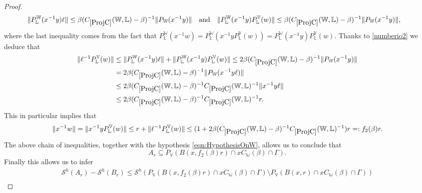 \documentclass[10pt, a4paper,
oneside, headinclude,footinclude]{scrartcl}
\begin{document}
\begin{proof}
 \begin{align}
      \lVert P_\mathbb{L}^\mathbb{W}(x^{-1}y)\ell\rVert\leq \beta(\oldC{ProjC}(\mathbb W,\mathbb L)-\beta)^{-1}\lVert P_\mathbb{W}(x^{-1}y)\rVert\quad&\text{and}\quad\lVert P_\mathbb{L}^\mathbb{W}(x^{-1}y)P_\mathbb{L}^\mathbb{V}(w)\rVert\leq \beta(\oldC{ProjC}(\mathbb W,\mathbb L)-\beta)^{-1}\lVert P_\mathbb{W}(x^{-1}y)\rVert,
       \label{numberio2}
 \end{align}
 where the last inequality comes from the fact that $P_\mathbb{L}^\mathbb{W}(x^{-1}w)=P_\mathbb{L}^\mathbb{W}(x^{-1}yP_\mathbb{L}^\mathbb{V}(w))=P_\mathbb{L}^\mathbb{W}(x^{-1}y)P_\mathbb{L}^\mathbb{V}(w)$.
 Thanks to \eqref{numberio2} we deduce that
 \begin{equation}
 \begin{split}
     \lVert \ell^{-1}P_\mathbb{L}^{\mathbb V}(w)\rVert&\leq \lVert P_\mathbb{L}^\mathbb{W}(x^{-1}y)\ell\rVert+\lVert P_\mathbb{L}^\mathbb{W}(x^{-1}y)P_\mathbb{L}^{\mathbb V}(w)\rVert\leq 2\beta(\oldC{ProjC}(\mathbb W,\mathbb L)-\beta)^{-1}\lVert P_\mathbb{W}(x^{-1}y)\rVert \\
     &= 2\beta(\oldC{ProjC}(\mathbb W,\mathbb L)-\beta)^{-1}\lVert P_\mathbb{W}(x^{-1}y\ell)\rVert\\
     &\leq 2\beta(\oldC{ProjC}(\mathbb W,\mathbb L)-\beta)^{-1} \oldC{ProjC}(\mathbb{W},\mathbb{L})^{-1}\lVert x^{-1}y\ell\rVert \\
     &\leq 2\beta(\oldC{ProjC}(\mathbb W,\mathbb L)-\beta)^{-1} \oldC{ProjC}(\mathbb{W},\mathbb{L})^{-1}r.
     \end{split}
     \end{equation}
      This in particular implies that
     $$
     \lVert x^{-1}w\rVert=\lVert x^{-1}yP_\mathbb{L}^{\mathbb V}(w)\rVert\leq r+\lVert \ell^{-1}P_\mathbb{L}^{\mathbb V}(w)\rVert\leq(1+2\beta(\oldC{ProjC}(\mathbb W,\mathbb L)-\beta)^{-1} \oldC{ProjC}(\mathbb{W},\mathbb{L})^{-1})r=:f_2(\beta)r.
     $$
The above chain of inequalities, together with the hypothesis \eqref{eqn:HypothesisOnW}, allows us to conclude that %
   $$A_r\subseteq P_\mathbb{V}(B(x,f_2(\beta)r)\cap xC_\mathbb{W}(\beta)\cap \Gamma).$$
Finally this allows us to infer
   \begin{equation}
       \begin{split}
           \mathcal{S}^h(A_r)-\mathcal{S}^h(B_r)
           \leq\mathcal{S}^h(P_\mathbb{V}(B(x,f_2(\beta)r)\cap xC_\mathbb{W}(\beta)\cap \Gamma)\setminus P_\mathbb{V}(B(x,r)\cap xC_\mathbb{W}(\beta)\cap \Gamma))\\

\end{split}
\end{equation}
\end{proof}
\end{document}
